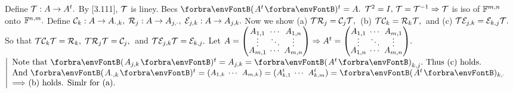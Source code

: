 \def\fT{\mT}\def\fC{\mC}\def\fR{\mR}\def\fP{\mE}

\BulletPointX{}\;\;Define $\fT:A\rightarrow A^t.$ By [3.111], $\fT$ is liney. Becs $\Par{A^t}{^t}=A.$ \TextB{}
$\fT^2=I,\,\fT=\fT^{-1}\Rightarrow \fT$ is iso of ${\mathbb{F}}^{m,n}$ onto ${\mathbb{F}}^{n,m}.$ \;Define $\fC_k:A\rightarrow A_{\cdot,k},\;\fR_j:A\rightarrow A_{j,\cdot},\;\fP_{j,k}:A\rightarrow A_{j,k}.$\TextB{}
Now we show (a) \uline{$\fT\fR_j=\fC_j\fT,$} \,(b) \uline{$\fT\fC_k=\fR_k\fT,$} \,and (c) \uline{$\fT\fP_{j,k}=\fP_{k,j}\fT.$}\TextB{\vspace{2pt}}
So that $\fT\fC_k\fT=\fR_k,\;\fT\fR_j\fT=\fC_j,$ \,and $\fT\fP_{j,k}\fT=\fP_{k,j}.$\TextB{\vspace{2pt}}
Let $A={}{\normalsize\begin{pmatrix}A_{1,1} &\hspace{-6pt} \cdots &\hspace{-6pt} A_{1,n}\\[-4pt] \vdots &\hspace{-6pt} \ddots &\hspace{-6pt} \vdots\\[-4pt] A_{m,1} &\hspace{-6pt} \cdots &\hspace{-6pt} A_{m,n}\end{pmatrix}}\Rightarrow A^t={}{\normalsize\begin{pmatrix}A_{1,1} &\hspace{-6pt} \cdots &\hspace{-6pt} A_{m,1}\\[-4pt] \vdots &\hspace{-6pt} \ddots &\hspace{-6pt} \vdots\\[-4pt] A_{1,n} &\hspace{-6pt} \cdots &\hspace{-6pt} A_{m,n}\end{pmatrix}}.$ \;$\MathLeftMid{l}{\!\!$
Note that $\Par{A_{j,k}}{^t}=A_{j,k}=\Par{A^t}_{k,j}.$ Thus (c) holds.$\\$
\!\!And $\Par{A_{\cdot,k}}{^t}={}{\small\begin{pmatrix}A_{1,k} &\hspace{-6pt} \cdots &\hspace{-6pt}A_{m,k}\end{pmatrix}}{}={}{\small\begin{pmatrix}A^t_{k,1} &\hspace{-6pt} \cdots &\hspace{-6pt}A^t_{k,m}\end{pmatrix}}{}=\Par{A^t}{_{k,\cdot}}\\$
\!\!$\Longrightarrow$ (b) holds. Simlr for (a).$}$\par\vspace{10pt}
\SepLine

